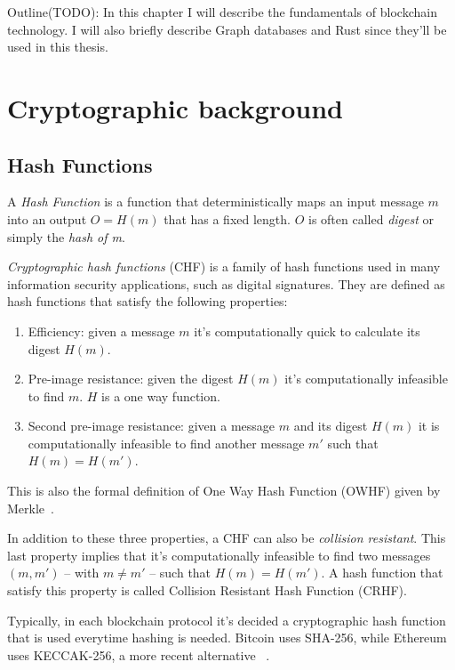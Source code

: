 
Outline(TODO): In this chapter I will describe the fundamentals of blockchain technology. I will also briefly describe Graph databases and Rust since they'll be used in this thesis.

\section{Cryptographic background}

\subsection{Hash Functions}

A \textit{Hash Function} is a function that deterministically maps an input message $m$ into an output $O=H(m)$ that has a fixed length. $O$ is often called \textit{digest} or simply the \textit{hash of m}.\

\textit{Cryptographic hash functions} (CHF) is a family of hash functions used in many information security applications, such as digital signatures. They are defined as hash functions that satisfy the following properties:

\begin{enumerate}
    \item Efficiency: given a message $m$ it's computationally quick to calculate its digest $H(m)$.
    \item Pre-image resistance: given the digest $H(m)$ it's computationally infeasible to find $m$. $H$ is a one way function.
    \item Second pre-image resistance: given a message $m$ and its digest $H(m)$ it is computationally infeasible to find another message $m'$ such that $H(m)=H(m')$.
\end{enumerate}

This is also the formal definition of One Way Hash Function (OWHF) given by Merkle~\cite{chf}. \

In addition to these three properties, a CHF can also be \textit{collision resistant}. This last property implies that it's computationally infeasible to find two messages $(m,m')$ -- with $m\neq m'$ -- such that $H(m)=H(m')$. A hash function that satisfy this property is called Collision Resistant Hash Function (CRHF).

Typically, in each blockchain protocol it's decided a cryptographic hash function that is used everytime hashing is needed. Bitcoin uses SHA-256, while Ethereum uses KECCAK-256, a more recent alternative~\cite{bitcoin} \cite{Ethereum}.

